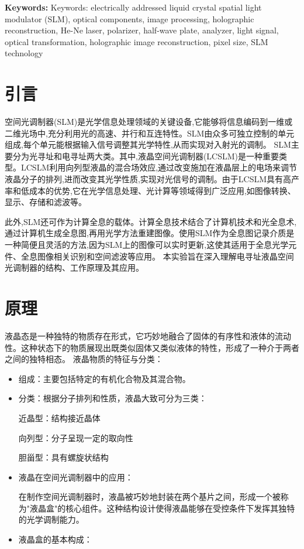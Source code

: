 \documentclass{whureport}
\begin{document}
\textbf{Keywords: }Keywords: electrically addressed liquid crystal spatial light modulator (SLM), optical components, image processing, holographic reconstruction, He-Ne laser, polarizer, half-wave plate, analyzer, light signal, optical transformation, holographic image reconstruction, pixel size, SLM technology

\begin{multicols}{2}
\section{引言}
空间光调制器(SLM)是光学信息处理领域的关键设备,它能够将信息编码到一维或二维光场中,充分利用光的高速、并行和互连特性。SLM由众多可独立控制的单元组成,每个单元能根据输入信号调整其光学特性,从而实现对入射光的调制。
SLM主要分为光寻址和电寻址两大类。其中,液晶空间光调制器(LCSLM)是一种重要类型。LCSLM利用向列型液晶的混合场效应,通过改变施加在液晶层上的电场来调节液晶分子的排列,进而改变其光学性质,实现对光信号的调制。由于LCSLM具有高产率和低成本的优势,它在光学信息处理、光计算等领域得到广泛应用,如图像转换、显示、存储和滤波等。

此外,SLM还可作为计算全息的载体。计算全息技术结合了计算机技术和光全息术,通过计算机生成全息图,再用光学方法重建图像。使用SLM作为全息图记录介质是一种简便且灵活的方法,因为SLM上的图像可以实时更新,这使其适用于全息光学元件、全息图像相关识别和空间滤波等应用。
本实验旨在深入理解电寻址液晶空间光调制器的结构、工作原理及其应用。

\section{原理}
液晶态是一种独特的物质存在形式，它巧妙地融合了固体的有序性和液体的流动性。这种状态下的物质展现出既类似固体又类似液体的特性，形成了一种介于两者之间的独特相态。
液晶物质的特征与分类：
\begin{itemize}
\item 组成：主要包括特定的有机化合物及其混合物。
\item 分类：根据分子排列和性质，液晶大致可分为三类：

近晶型：结构接近晶体

向列型：分子呈现一定的取向性

胆甾型：具有螺旋状结构


\item 液晶在空间光调制器中的应用：

在制作空间光调制器时，液晶被巧妙地封装在两个基片之间，形成一个被称为"液晶盒"的核心组件。这种结构设计使得液晶能够在受控条件下发挥其独特的光学调制能力。
\item 液晶盒的基本构成：


\end{itemize}
\end{multicols}
\end{document}
